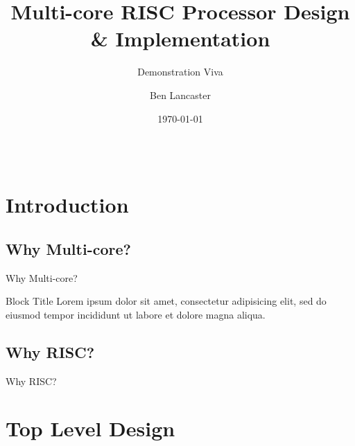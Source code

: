 \documentclass[aspectratio=169]{beamer}
\title
    [Main Project]
    {\textbf{Multi-core RISC Processor Design \& Implementation}}
\subtitle{Demonstration Viva}
\author
    [B. Lancaster]
    {Ben Lancaster}
\institute
    [\hypersetup{urlcolor=jdgrey}%
     \href{https://bendl.me/}{https://bendl.me}
    ]
    {201280376\\
    ELEC5881M - Main Project}
\date
    [12/2016]
    {\today}
\begin{document}
\begin{frame}[plain]
\titlepage
\end{frame}

\begin{frame}
\vspace{-1cm}
\begin{columns}[t]
        \begin{column}{.5\textwidth}
            \tableofcontents[sections={1-3}]
        \end{column}
        \begin{column}{.5\textwidth}
            \tableofcontents[sections={4-5}]
        \end{column}
    \end{columns}
\end{frame}

\section{Introduction}
\frame{\tableofcontents[currentsection, subsectionstyle=show/show/hide]}

\subsection{Why Multi-core?}
\begin{frame}{Why Multi-core?}
\begin{alertblock}{Block Title}
Lorem ipsum dolor sit amet, consectetur adipisicing elit, 
sed do eiusmod tempor incididunt ut labore et 
dolore magna aliqua.
\end{alertblock}
\end{frame}

\subsection{Why RISC?}
\begin{frame}{Why RISC?}
\end{frame}

\section{Top Level Design}
\frame{\tableofcontents[currentsection, subsectionstyle=show/show/hide]}
\end{document}

